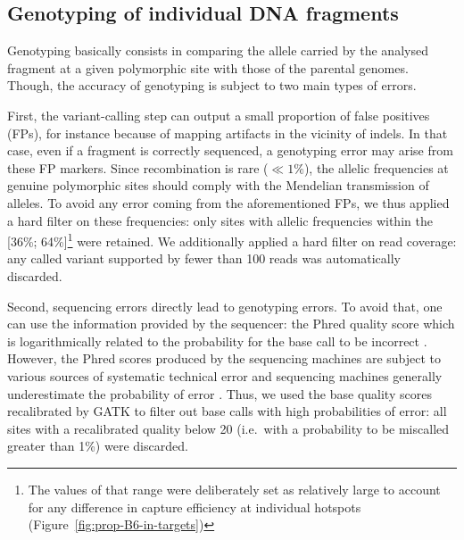\subsection{Genotyping of individual DNA fragments}

\begin{mccorrection}
Genotyping basically consists in comparing the allele carried by the analysed fragment at a given polymorphic site with those of the parental genomes.
Though, the accuracy of genotyping is subject to two main types of errors.

First, the variant-calling step can output a small proportion of false positives (FPs), for instance because of mapping artifacts in the vicinity of indels.
In that case, even if a fragment is correctly sequenced, a genotyping error may arise from these FP markers.
Since recombination is rare ($\ll 1\%$), the allelic frequencies at genuine polymorphic sites should comply with the Mendelian transmission of alleles.
To avoid any error coming from the aforementioned FPs, we thus applied a hard filter on these frequencies: only sites with allelic frequencies within the [36\%; 64\%]\footnote{The values of that range were deliberately set as relatively large to account for any difference in capture efficiency at individual hotspots (Figure~\ref{fig:prop-B6-in-targets})} were retained.
We additionally applied a hard filter on read coverage: any called variant supported by fewer than 100 reads was automatically discarded.

Second, sequencing errors directly lead to genotyping errors.
To avoid that, one can use the information provided by the sequencer: the Phred quality score which is logarithmically related to the probability for the base call to be incorrect \citep{ewing1998basecalling,ewing1998basecallinga}.
However, the Phred scores produced by the sequencing machines are subject to various sources of systematic technical error and sequencing machines generally underestimate the probability of error \citep{gatk2012base}.
Thus, we used the base quality scores recalibrated by GATK to filter out base calls with high probabilities of error: all sites with a recalibrated quality below 20 (i.e.\ with a probability to be miscalled greater than 1\%) were discarded.
\end{mccorrection}

